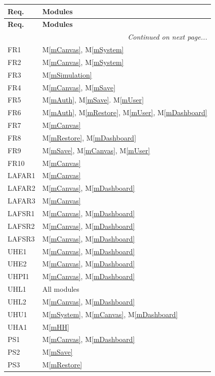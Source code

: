 \documentclass[12pt, titlepage]{article}
\newcommand{\mref}[1]{M\ref{#1}}
\begin{document}
\renewcommand{\arraystretch}{1.2} %
\begin{longtable}{p{} p{}}
\toprule
\textbf{Req.} & \textbf{Modules} \\
\midrule
\endfirsthead
\toprule
\textbf{Req.} & \textbf{Modules} \\
\midrule
\endhead
\midrule
\multicolumn{2}{r}{\textit{Continued on next page...}} \\
\midrule
\endfoot
\bottomrule
\endlastfoot
FR1 & \mref{mCanvas}, \mref{mSystem} \\
FR2 & \mref{mCanvas}, \mref{mSystem} \\
FR3 & \mref{mSimulation} \\
FR4 & \mref{mCanvas}, \mref{mSave} \\
FR5 & \mref{mAuth}, \mref{mSave}. \mref{mUser} \\
FR6 & \mref{mAuth}, \mref{mRestore}, \mref{mUser}, \mref{mDashboard} \\
FR7 & \mref{mCanvas} \\
FR8 & \mref{mRestore}, \mref{mDashboard} \\
FR9 & \mref{mSave}, \mref{mCanvas}, \mref{mUser} \\
FR10 & \mref{mCanvas} \\
LAFAR1 & \mref{mCanvas}\\
LAFAR2 & \mref{mCanvas}, \mref{mDashboard}\\
LAFAR3 & \mref{mCanvas}\\
LAFSR1 & \mref{mCanvas}, \mref{mDashboard}\\
LAFSR2 & \mref{mCanvas}, \mref{mDashboard}\\
LAFSR3 & \mref{mCanvas}, \mref{mDashboard}\\
UHE1 & \mref{mCanvas}, \mref{mDashboard}\\
UHE2 & \mref{mCanvas}, \mref{mDashboard}\\
UHPI1 & \mref{mCanvas}, \mref{mDashboard}\\
UHL1 & All modules\\
UHL2 & \mref{mCanvas}, \mref{mDashboard}\\
UHU1 & \mref{mSystem}, \mref{mCanvas}, \mref{mDashboard}\\
UHA1 & \mref{mHH}\\
PS1 & \mref{mCanvas}, \mref{mDashboard}\\
PS2 & \mref{mSave}\\
PS3 & \mref{mRestore}\\

\end{longtable}
\end{document}

